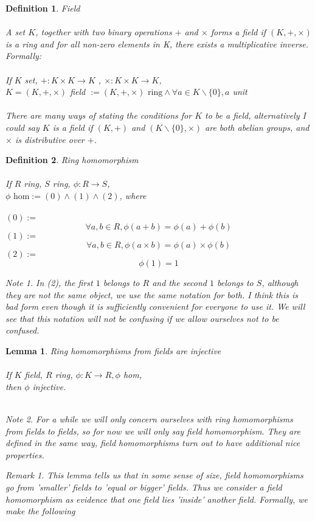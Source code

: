 \documentclass{article}
\theoremstyle{definitionstyle}
\newtheorem{defn}{Definition}[section]
\theoremstyle{lemmastyle}
\newtheorem{lem}{Lemma}[section]
\theoremstyle{remark}
\newtheorem*{note}{Note}
\newtheorem*{remark}{Remark}
\begin{document}
\begin{defn} Field\\
\\
A set $K$, together with two binary operations $+$ and $\times$ forms a field if $(K,+,\times)$  is a ring and for all non-zero elements in K, there exists a multiplicative inverse. Formally:\\
\\
If $K$ set, $+ : K \times K \to K$ , $\times : K \times K \to K$,\\

$K = (K,+,\times)$ field $:=(K,+,\times) \textrm{ ring} \land \forall a \in K\backslash \{0\}, a$ unit\\
\\
There are many ways of stating the conditions for $K$ to be a field, alternatively I could say $K$ is a field if $(K,+)$ and $(K\backslash \{0\},\times)$ are both abelian groups, and $\times$ is distributive over $+$.\end{defn}
%
\begin{defn} Ring homomorphism\\
\\
If $R$ ring, $S$ ring, $\phi : R \to S$,\\

$ \phi \textrm{ hom} := (0) \land (1) \land (2)$, where\\
\\
$(0):=$\[\forall a,b \in R, \phi (a+b) = \phi(a) + \phi(b) \]
$(1):=$\[\forall a,b \in R, \phi(a\times b) = \phi (a) \times \phi (b) \]
$(2):=$\[\phi(1)=1\]
\begin{note} In (2), the first $1$ belongs to $R$ and the second $1$ belongs to $S$, although they are not the same object, we use the same notation for both. I think this is bad form even though it is sufficiently convenient for everyone to use it. We will see that this notation will not be confusing if we allow ourselves not to be confused.\end{note} \end{defn}
\begin{lem} Ring homomorphisms from fields are injective\\
 \\
If $K$ field, $R$ ring, $\phi : K \to R, \phi$ hom,\\

then $\phi$ injective.\\
\\
\begin{note} For a while we will only concern ourselves with ring homomorphisms from fields to fields, so for now we will only say field homomorphism. They are defined in the same way, field homomorphisms turn out to have additional nice properties.\\ \end{note}
\begin{remark} This lemma tells us that in some sense of size, field homomorphisms go from 'smaller' fields to 'equal or bigger' fields. Thus we consider a field homomorphism as evidence that one field lies 'inside' another field. Formally, we make the following \end{remark}
\end{lem}
\end{document}
